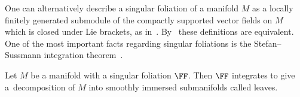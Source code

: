 One can alternatively describe a singular foliation of a manifold $M$ as a locally finitely generated submodule of the compactly supported vector fields on $M$ which is closed under Lie brackets, as in~\cite{iakovos2}. By~\cite[Remark 1.8]{GarZam} these definitions are equivalent. One of the most important facts regarding singular foliations is the Stefan--Sussmann integration theorem~\cite{stefan, sussmann}.

\begin{Theorem}%
Let $M$ be a manifold with a singular foliation $\FF$. Then $\FF$ integrates to give a~decom\-position of $M$ into smoothly immersed submanifolds called leaves.
\end{Theorem}

